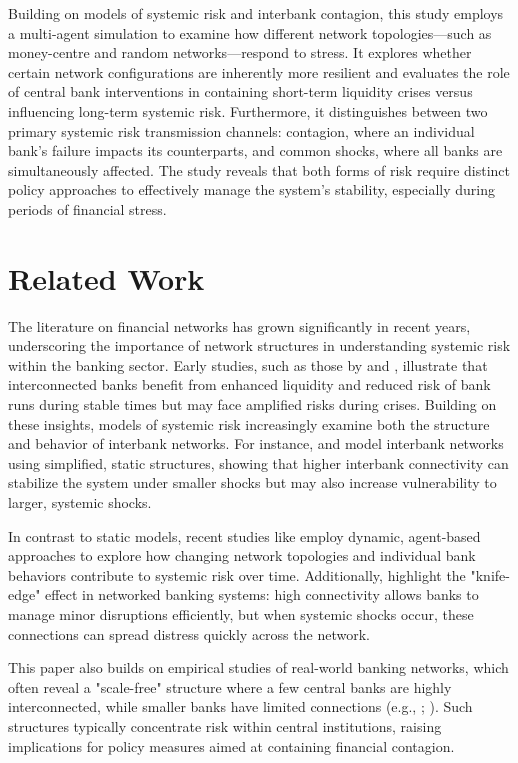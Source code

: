 \documentclass{article} %
\begin{document}
Building on models of systemic risk and interbank contagion, this study employs a multi-agent simulation to examine how different network topologies—such as money-centre and random networks—respond to stress. It explores whether certain network configurations are inherently more resilient and evaluates the role of central bank interventions in containing short-term liquidity crises versus influencing long-term systemic risk. Furthermore, it distinguishes between two primary systemic risk transmission channels: contagion, where an individual bank’s failure impacts its counterparts, and common shocks, where all banks are simultaneously affected. The study reveals that both forms of risk require distinct policy approaches to effectively manage the system’s stability, especially during periods of financial stress.

\section{Related Work}

The literature on financial networks has grown significantly in recent years, underscoring the importance of network structures in understanding systemic risk within the banking sector. Early studies, such as those by \cite{allen2000financial} and \cite{freixas2000systemic}, illustrate that interconnected banks benefit from enhanced liquidity and reduced risk of bank runs during stable times but may face amplified risks during crises. Building on these insights, models of systemic risk increasingly examine both the structure and behavior of interbank networks. For instance, \cite{iori2006systemic} and \cite{nier2008network} model interbank networks using simplified, static structures, showing that higher interbank connectivity can stabilize the system under smaller shocks but may also increase vulnerability to larger, systemic shocks.

In contrast to static models, recent studies like \cite{bluhm2012endogenous} employ dynamic, agent-based approaches to explore how changing network topologies and individual bank behaviors contribute to systemic risk over time. Additionally, \cite{gai2010contagion} highlight the "knife-edge" effect in networked banking systems: high connectivity allows banks to manage minor disruptions efficiently, but when systemic shocks occur, these connections can spread distress quickly across the network.

This paper also builds on empirical studies of real-world banking networks, which often reveal a "scale-free" structure where a few central banks are highly interconnected, while smaller banks have limited connections (e.g., \cite{boss2004network}; \cite{degryse2007interbank}). Such structures typically concentrate risk within central institutions, raising implications for policy measures aimed at containing financial contagion.
\end{document}
